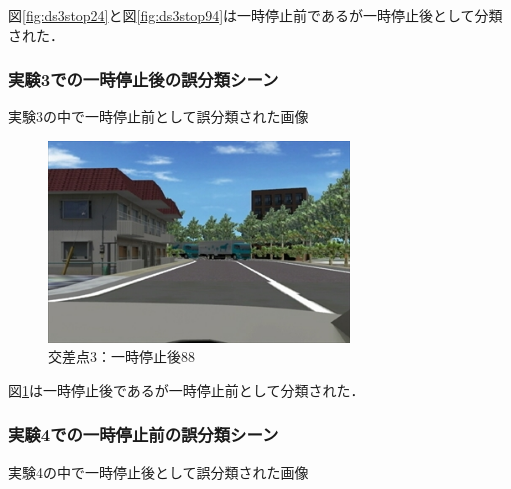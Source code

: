 図\ref{fig:ds3stop24}と図\ref{fig:ds3stop94}は一時停止前であるが一時停止後として分類された．\\


\subsubsection*{実験3での一時停止後の誤分類シーン}
実験3の中で一時停止前として誤分類された画像\\

\begin{figure}[htbp]
  \begin{center}
    \includegraphics[clip,width=8.0cm]{./images/ds3turn088.png}
    \caption{交差点3：一時停止後88}
    \label{fig:ds3turn88}
  \end{center}
\end{figure}

図\ref{fig:ds3turn88}は一時停止後であるが一時停止前として分類された．\\


\subsubsection*{実験4での一時停止前の誤分類シーン}
実験4の中で一時停止後として誤分類された画像\\

